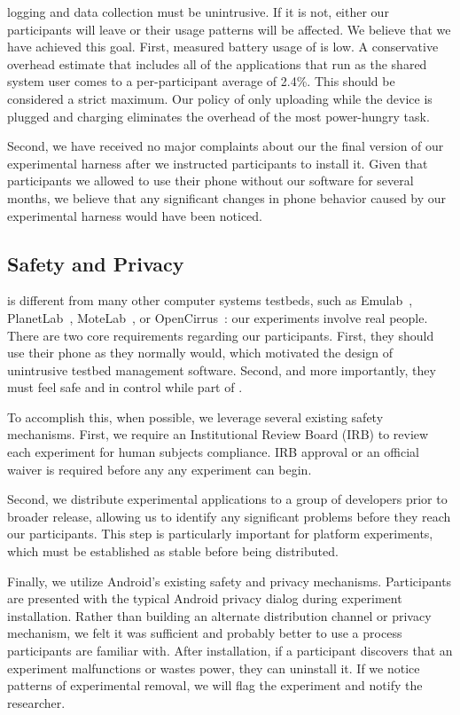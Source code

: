 \PhoneLab{} logging and data collection must be unintrusive. If it is not,
either our participants will leave or their usage patterns will be affected.
We believe that we have achieved this goal. First, measured battery usage of
\PhoneLab{} is low. A conservative overhead estimate that includes all of the
applications that run as the shared system user comes to a per-participant
average of 2.4\%. This should be considered a strict maximum. Our policy of
only uploading while the device is plugged and charging eliminates the
overhead of the most power-hungry task.

Second, we have received no major complaints about our the final version of
our \PhoneLab{} experimental harness after we instructed participants to
install it. Given that participants we allowed to use their phone without our
software for several months, we believe that any significant changes in phone
behavior caused by our experimental harness would have been noticed.

\subsection{Safety and Privacy}

\PhoneLab{} is different from many other computer systems testbeds, such as
Emulab~\cite{white:osdi:2002, emulab}, PlanetLab~\cite{peterson:ccr:2003,
planetlab}, MoteLab~\cite{werner-allen:ipsn:2005}, or
OpenCirrus~\cite{avetisyan:computer:2010, opencirrus}: our experiments
involve real people. There are two core requirements regarding our
participants. First, they should use their phone as they normally would,
which motivated the design of unintrusive testbed management software.
Second, and more importantly, they must feel safe and in control while part
of \PhoneLab{}.

To accomplish this, when possible, we leverage several existing safety
mechanisms. First, we require an Institutional Review Board (IRB) to review
each \PhoneLab{} experiment for human subjects compliance. IRB approval or an
official waiver is required before any \PhoneLab{} any experiment can begin.

Second, we distribute experimental applications to a group of developers
prior to broader release, allowing us to identify any significant problems
before they reach our participants. This step is particularly important for
platform experiments, which must be established as stable before being
distributed.

Finally, we utilize Android's existing safety and privacy mechanisms.
Participants are presented with the typical Android privacy dialog during
experiment installation. Rather than building an alternate distribution
channel or privacy mechanism, we felt it was sufficient and probably better
to use a process participants are familiar with. After installation, if a
participant discovers that an experiment malfunctions or wastes power, they
can uninstall it. If we notice patterns of experimental removal, we will flag
the experiment and notify the researcher.

